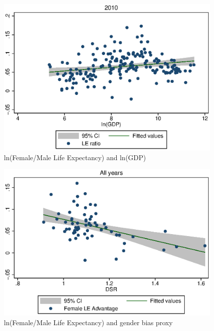 \documentclass[legno]{beamer}
\begin{document}
\begin{frame}
\begin{figure}
\caption{ln(Female/Male Life Expectancy) and ln(GDP)}
\includegraphics[scale=0.8]{./figures/lLErGDP2010.eps}
\end{figure}
\end{frame}

\begin{frame}
\begin{figure}
\caption{ln(Female/Male Life Expectancy) and gender bias proxy}
\includegraphics[scale=0.8]{./figures/lLErdesiredall.eps}
\end{figure}
\end{frame}
\end{document}
